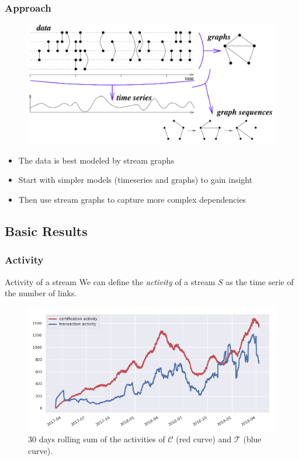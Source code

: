 \documentclass{beamer}
\begin{document}
\begin{frame}
\frametitle{Approach}

\begin{figure}
\includegraphics[width=.8\linewidth]{./figures/stream_graph_signal}
\end{figure}

\begin{itemize}
\item The data is best modeled by stream graphs
\item Start with simpler models (timeseries and graphs) to gain insight
\item Then use stream graphs to capture more complex dependencies
\end{itemize}

\end{frame}

\subsection{Basic Results}


\begin{frame}
\frametitle{Activity}

\begin{block}{Activity of a stream}
We can define the \textit{activity} of a stream $S$ as the time serie of the number of links.
\end{block}

\bigskip

\begin{figure}
\includegraphics[width=.8\linewidth]{./figures/activity}
\caption{30 days rolling sum of the activities of $ \mathcal{C}$ (red curve) and $\mathcal{T}$ (blue curve).}
\end{figure}

\end{frame}
\end{document}
